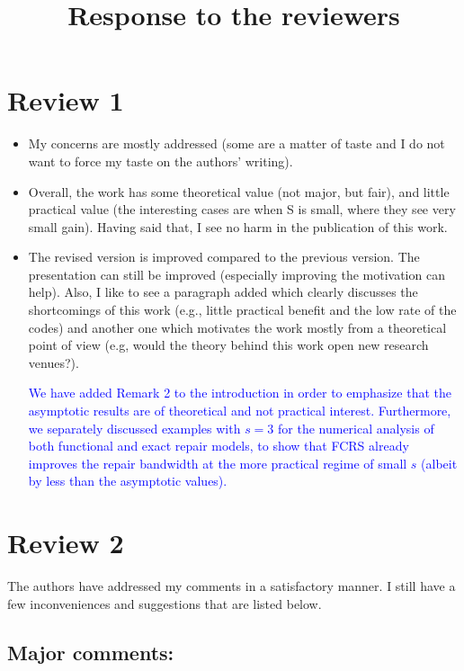 \documentclass{article}
\title{Response to the reviewers}
\begin{document}
\maketitle
\section*{Review 1}

\begin{itemize}
\item  My concerns are mostly addressed (some are a matter of taste and I do not want to force my taste on the authors' writing). 

\item Overall, the work has some theoretical value (not major, but fair), and little practical value (the interesting cases are when S is small, where they see very small gain). Having said that, I see no harm in the publication of this work. 

\item The revised version is improved compared to the previous version. The presentation can still be improved (especially improving the motivation can help). Also, I like to see a  paragraph added which clearly discusses the shortcomings of this work (e.g., little practical benefit and the low rate of the codes) and another one which motivates the work mostly from a theoretical point of view (e.g, would the theory behind this work open new research venues?). 

\textcolor{blue}{We have added Remark 2 to the introduction in order to emphasize that the asymptotic results are of theoretical and not practical interest. Furthermore, we separately discussed examples with $s =3$ for the numerical analysis of both functional and exact repair models, to show that FCRS already improves the repair bandwidth at the more practical regime of small $s$ (albeit by less than the asymptotic values). 
}

\end{itemize} 
\pagebreak


\section*{Review 2}

The authors have addressed my comments in a satisfactory manner. I still have a few inconveniences and suggestions that are listed below.

\subsection*{Major comments:}
\end{document}
